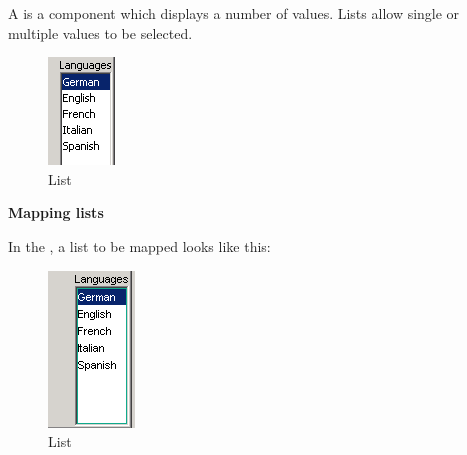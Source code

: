 A  is a component which displays a
number of values. Lists allow single or  multiple values to be selected. 


\begin{figure}
\begin{center}
\includegraphics{PS/List}
\caption{List}
\label{list}
\end{center}
\end{figure}

\textbf{Mapping lists}

In the \gdomm{}, a list to be mapped looks like this:

\begin{figure}
\begin{center}
\includegraphics{PS/Maplist}
\caption{List}
\label{maplist}
\end{center}
\end{figure}
